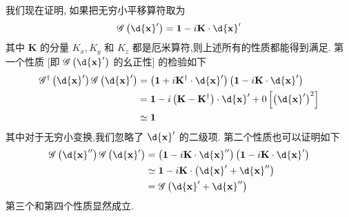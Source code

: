 \documentclass[lang=cn,newtx,10pt,scheme=chinese,thmcnt=section]{elegantbook}
\begin{document}
我们现在证明, 如果把无穷小平移算符取为
\begin{equation}\label{1.159}
	\mathscr{G}\left( {\d{\mathbf{x}}^{\prime }}\right) = \textbf{1} - i\mathbf{K} \cdot \d{\mathbf{x}}^{\prime }
\end{equation}
其中 $\mathbf{K}$ 的分量 ${K}_{x},{K}_{y}$ 和 ${K}_{z}$ 都是厄米算符,则上述所有的性质都能得到满足. 第一个性质 [即 $\mathscr{G}\left( {\d{\mathbf{x}}^{\prime }}\right)$ 的幺正性] 的检验如下
\begin{equation}
	\begin{aligned}
		{\mathscr{G}}^{ \dagger }\left( {\d{\mathbf{x}}^{\prime }}\right) \mathscr{G}\left( {\d{\mathbf{x}}^{\prime }}\right) &= \left( {\textbf{1} + i{\mathbf{K}}^{ \dagger } \cdot \d{\mathbf{x}}^{\prime }}\right) \left( {\textbf{1} - i\mathbf{K} \cdot \d{\mathbf{x}}^{\prime }}\right)\\
		&= \textbf{1} - i\left( {\mathbf{K} - {\mathbf{K}}^{ \dagger }}\right) \cdot \d{\mathbf{x}}^{\prime } + 0\left\lbrack {\left( \d{\mathbf{x}}^{\prime }\right) }^{2}\right\rbrack\\
		&\simeq \textbf{1}
	\end{aligned}
\end{equation}
其中对于无穷小变换,我们忽略了 $\d{\mathbf{x}}^{\prime }$ 的二级项. 第二个性质也可以证明如下
\begin{equation}
	\begin{aligned}
		\mathscr{G}\left( {\d{\mathbf{x}}^{\prime \prime }}\right) \mathscr{G}\left( {\d{\mathbf{x}}^{\prime }}\right) &= \left( {\textbf{1} - i\mathbf{K} \cdot \d{\mathbf{x}}^{\prime \prime }}\right) \left( {\textbf{1} - i\mathbf{K} \cdot \d{\mathbf{x}}^{\prime }}\right)\\
		&\simeq \textbf{1} - i\mathbf{K} \cdot \left( {\d{\mathbf{x}}^{\prime } + \d{\mathbf{x}}^{\prime \prime }}\right) \\
		&= \mathscr{G}\left( {\d{\mathbf{x}}^{\prime } + \d{\mathbf{x}}^{\prime \prime }}\right)
	\end{aligned}
\end{equation}
第三个和第四个性质显然成立.
\end{document}
